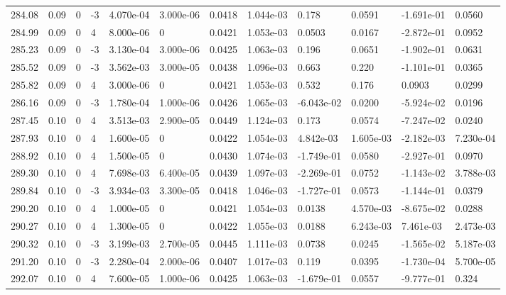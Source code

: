\documentclass[preview]{standalone}
\begin{document}
{{{{{{{{{{{{{{\begin{tabular}{L{1.2cm}C{1.2cm} C{0.3cm}C{0.5cm} C{1.4cm}C{1.4cm} C{1.4cm}C{1.4cm} C{1.6cm}C{1.6cm} C{1.6cm}C{1.6cm}}
  284.08  &  0.09  & 0     & -3 &  4.070e-04  & 3.000e-06  &  0.0418&   1.044e-03& 0.178 & 0.0591   &  -1.691e-01 & 0.0560  \\ 
  284.99  &  0.09  & 0     &  4 &  8.000e-06  & 0  &  0.0421&   1.053e-03& 0.0503 & 0.0167   &  -2.872e-01 & 0.0952  \\ 
  285.23  &  0.09  & 0     & -3 &  3.130e-04  & 3.000e-06  &  0.0425&   1.063e-03& 0.196 & 0.0651   &  -1.902e-01 & 0.0631  \\ 
  285.52  &  0.09  & 0     & -3 &  3.562e-03  & 3.000e-05  &  0.0438&   1.096e-03& 0.663 & 0.220   &  -1.101e-01 & 0.0365  \\ 
  285.82  &  0.09  & 0     &  4 &  3.000e-06  & 0  &  0.0421&   1.053e-03& 0.532 & 0.176   &  0.0903 & 0.0299  \\ 
  286.16  &  0.09  & 0     & -3 &  1.780e-04  & 1.000e-06  &  0.0426&   1.065e-03& -6.043e-02 & 0.0200   &  -5.924e-02 & 0.0196  \\ 
  287.45  &  0.10  & 0     &  4 &  3.513e-03  & 2.900e-05  &  0.0449&   1.124e-03& 0.173 & 0.0574   &  -7.247e-02 & 0.0240  \\ 
  287.93  &  0.10  & 0     &  4 &  1.600e-05  & 0  &  0.0422&   1.054e-03& 4.842e-03 & 1.605e-03   &  -2.182e-03 & 7.230e-04  \\ 
  288.92  &  0.10  & 0     &  4 &  1.500e-05  & 0  &  0.0430&   1.074e-03& -1.749e-01 & 0.0580   &  -2.927e-01 & 0.0970  \\ 
  289.30  &  0.10  & 0     &  4 &  7.698e-03  & 6.400e-05  &  0.0439&   1.097e-03& -2.269e-01 & 0.0752   &  -1.143e-02 & 3.788e-03  \\ 
  289.84  &  0.10  & 0     & -3 &  3.934e-03  & 3.300e-05  &  0.0418&   1.046e-03& -1.727e-01 & 0.0573   &  -1.144e-01 & 0.0379  \\ 
  290.20  &  0.10  & 0     &  4 &  1.000e-05  & 0  &  0.0421&   1.054e-03& 0.0138 & 4.570e-03   &  -8.675e-02 & 0.0288  \\ 
  290.27  &  0.10  & 0     &  4 &  1.300e-05  & 0  &  0.0422&   1.055e-03& 0.0188 & 6.243e-03   &  7.461e-03 & 2.473e-03  \\ 
  290.32  &  0.10  & 0     & -3 &  3.199e-03  & 2.700e-05  &  0.0445&   1.111e-03& 0.0738 & 0.0245   &  -1.565e-02 & 5.187e-03  \\ 
  291.20  &  0.10  & 0     & -3 &  2.280e-04  & 2.000e-06  &  0.0407&   1.017e-03& 0.119 & 0.0395   &  -1.730e-04 & 5.700e-05  \\ 
  292.07  &  0.10  & 0     &  4 &  7.600e-05  & 1.000e-06  &  0.0425&   1.063e-03& -1.679e-01 & 0.0557   &  -9.777e-01 & 0.324  \\ 

\end{tabular}}}}}}}}}}}}}}}
\end{document}
